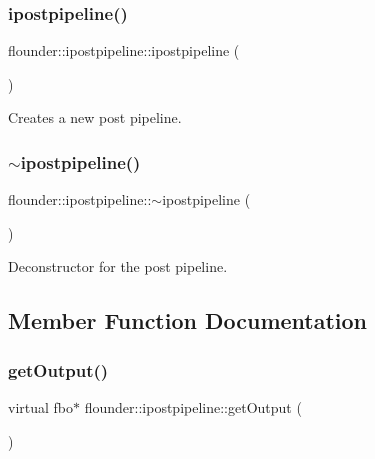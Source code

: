 \subsubsection{\texorpdfstring{ipostpipeline()}{ipostpipeline()}}
{\footnotesize\ttfamily flounder\+::ipostpipeline\+::ipostpipeline (\begin{DoxyParamCaption}{ }\end{DoxyParamCaption})}



Creates a new post pipeline. 

\mbox{\label{classflounder_1_1ipostpipeline_a82ab1aded690131f211c5627c54f2c4c}} 
\subsubsection{\texorpdfstring{$\sim$ipostpipeline()}{~ipostpipeline()}}
{\footnotesize\ttfamily flounder\+::ipostpipeline\+::$\sim$ipostpipeline (\begin{DoxyParamCaption}{ }\end{DoxyParamCaption})\hspace{0.3cm}{\ttfamily [virtual]}}



Deconstructor for the post pipeline. 



\subsection{Member Function Documentation}
\mbox{\label{classflounder_1_1ipostpipeline_a08f5d19b9652528337b73c2f4e0e4258}} 
\subsubsection{\texorpdfstring{get\+Output()}{getOutput()}}
{\footnotesize\ttfamily virtual fbo$\ast$ flounder\+::ipostpipeline\+::get\+Output (\begin{DoxyParamCaption}{ }\end{DoxyParamCaption})\hspace{0.3cm}{\ttfamily [pure virtual]}}



